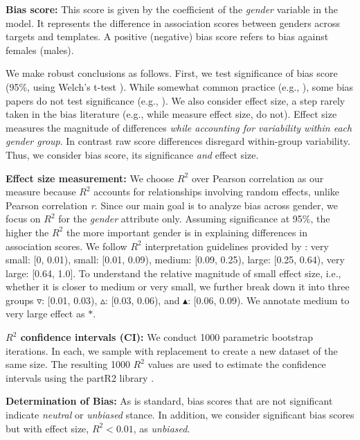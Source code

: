 \textbf{Bias score:} This score is given by the coefficient of the \textit{gender} variable in the model. It represents the difference in association scores between genders across targets and templates.
%
A positive (negative) bias score refers to bias against females (males).


We make robust conclusions as follows.
First, we test significance of bias score (95\%, using Welch's t-test \cite{welch1947generalization}). While somewhat common practice  
(e.g., 
\citet{koksal2023language, bartl-etal-2020-unmasking}), some bias papers do not test significance (e.g., 
\citet{guo2022auto,kaneko2022unmasking,ahn-oh-2021-mitigating}).
%
We also consider effect size, a step rarely taken in the bias literature (e.g., while \citet{dayanik2022analysis,bartl-etal-2020-unmasking,kurita-etal-2019-measuring} measure effect size, \citet{kim2023race,guo2022auto,kaneko2022unmasking,limisiewicz-marecek-2022-dont} do not).
Effect size measures the magnitude of differences \emph{while accounting for variability within each gender group}.
%
In contrast raw score differences disregard within-group variability. Thus, we consider bias score, its significance \emph{and} effect size.

\vspace{0.5em} 
\noindent \textbf{Effect size measurement:} 
We choose $R^2$ over  Pearson correlation as our measure because $R^2$ accounts for relationships involving random effects, unlike Pearson correlation \textit{r}.
%
Since our main goal is to analyze bias across gender, we focus on $R^2$ for the \textit{gender} attribute only.
%
Assuming significance at 95\%, the higher the $R^2$ the more important gender is in explaining differences in association scores.
%
We follow $R^2$ interpretation guidelines provided by \citet{cohen1988statistical}: very small: [0, 0.01), small: [0.01, 0.09), medium: [0.09, 0.25), large: [0.25, 0.64), very large: [0.64, 1.0].
%
To understand the relative magnitude of small effect size, i.e., whether it is closer to medium or very small, we further break down it into three groups {\scriptsize $\triangledown$}: [0.01, 0.03),
%
{\scriptsize $\vartriangle$}: [0.03, 0.06),
and {\scriptsize $\blacktriangle$}: [0.06, 0.09).
We annotate medium to very large effect as $*$.


\vspace{0.5em}
\noindent \textbf{$R^2$ confidence intervals (CI):} %
We conduct 1000 
parametric bootstrap iterations.
%
In each,  
we sample with replacement to create a new dataset of the same size. 
%
The resulting 1000 $ R^2$ values are used to estimate the confidence intervals using the partR2 library \cite{stoffel2021partr2}. 

\vspace{0.5em}
\noindent \textbf{Determination of Bias:} As is standard, bias scores that are not significant indicate \textit{neutral} or \textit{unbiased} stance. 
In addition, we consider significant bias scores but with effect size, $R^2 < 0.01$, as \textit{unbiased}.
